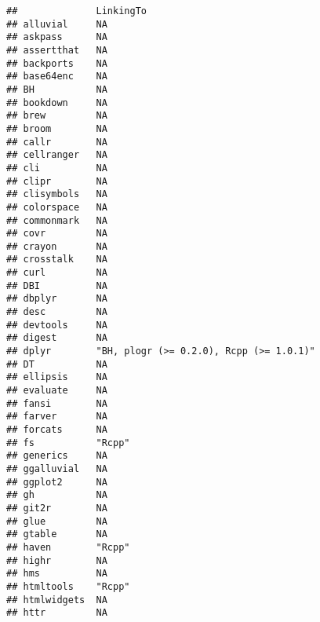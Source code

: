 \documentclass[]{book}
\begin{document}
\begin{verbatim}
##              LinkingTo                              
## alluvial     NA                                     
## askpass      NA                                     
## assertthat   NA                                     
## backports    NA                                     
## base64enc    NA                                     
## BH           NA                                     
## bookdown     NA                                     
## brew         NA                                     
## broom        NA                                     
## callr        NA                                     
## cellranger   NA                                     
## cli          NA                                     
## clipr        NA                                     
## clisymbols   NA                                     
## colorspace   NA                                     
## commonmark   NA                                     
## covr         NA                                     
## crayon       NA                                     
## crosstalk    NA                                     
## curl         NA                                     
## DBI          NA                                     
## dbplyr       NA                                     
## desc         NA                                     
## devtools     NA                                     
## digest       NA                                     
## dplyr        "BH, plogr (>= 0.2.0), Rcpp (>= 1.0.1)"
## DT           NA                                     
## ellipsis     NA                                     
## evaluate     NA                                     
## fansi        NA                                     
## farver       NA                                     
## forcats      NA                                     
## fs           "Rcpp"                                 
## generics     NA                                     
## ggalluvial   NA                                     
## ggplot2      NA                                     
## gh           NA                                     
## git2r        NA                                     
## glue         NA                                     
## gtable       NA                                     
## haven        "Rcpp"                                 
## highr        NA                                     
## hms          NA                                     
## htmltools    "Rcpp"                                 
## htmlwidgets  NA                                     
## httr         NA                                     

\end{verbatim}
\end{document}
